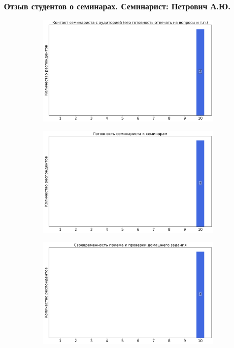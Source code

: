     \subsubsection{Отзыв студентов о семинарах. Семинарист: Петрович А.Ю.}
		\begin{figure}[H]
			\centering
			\begin{subfigure}[b]{0.45\textwidth}
				\centering
				\includegraphics[width=\textwidth]{images/2 course/Дифференциальные уравнения/seminarists-marks-Петрович А.Ю.-0.png}
			\end{subfigure}
			\begin{subfigure}[b]{0.45\textwidth}
				\centering
				\includegraphics[width=\textwidth]{images/2 course/Дифференциальные уравнения/seminarists-marks-Петрович А.Ю.-1.png}
			\end{subfigure}
			\begin{subfigure}[b]{0.45\textwidth}
				\centering
				\includegraphics[width=\textwidth]{images/2 course/Дифференциальные уравнения/seminarists-marks-Петрович А.Ю.-2.png}

\end{subfigure}
\end{figure}
